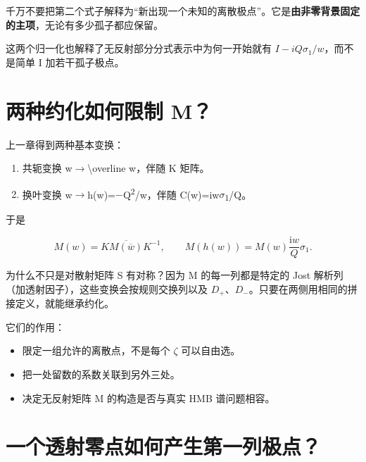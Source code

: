 千万不要把第二个式子解释为“新出现一个未知的离散极点”。它是\textbf{由非零背景固定的主项}，无论有多少孤子都应保留。\par

这两个归一化也解释了无反射部分分式表示中为何一开始就有 $I-iQ\sigma{}_{1}/w$，而不是简单 I 加若干孤子极点。\par

\section{两种约化如何限制 M？}
\par

上一章得到两种基本变换：\par

\begin{enumerate}[leftmargin=2em]
\item 共轭变换 w\ensuremath{\to}\textbackslash{}overline w，伴随 K 矩阵。
\item 换叶变换 w\ensuremath{\to}h(w)=\ensuremath{-}Q\textsuperscript{2}/w，伴随 C(w)=iw\ensuremath{\sigma}\textsubscript{1}/Q。
\end{enumerate}

于是\par

\[
M(w)=K\overline{M(\overline w)}K^{-1},
\qquad
M(h(w))=M(w)\dfrac{\mathrm{i}w}{Q}\sigma_1.
\]

为什么不只是对散射矩阵 S 有对称？因为 M 的每一列都是特定的 Jost 解析列（加透射因子），这些变换会按规则交换列以及 $D_{+}$、$D_{-}$。只要在两侧用相同的拼接定义，就能继承约化。\par

它们的作用：\par

\begin{itemize}[leftmargin=2em]
\item 限定一组允许的离散点，不是每个 \ensuremath{\zeta} 可以自由选。
\item 把一处留数的系数关联到另外三处。
\item 决定无反射矩阵 M 的构造是否与真实 HMB 谱问题相容。
\end{itemize}

\section{一个透射零点如何产生第一列极点？}
\par

